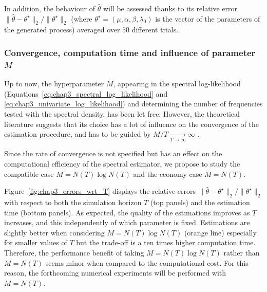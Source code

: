         In addition, the behaviour of $\hat \theta$ will be assessed thanks to its relative error ${\|\hat \theta - \theta^\star\|_2}/{\|\theta^\star\|_2}$
        (where $\theta^\star = (\mu, \alpha, \beta, \lambda_0)$ is the vector of the parameters of the generated process)
        averaged over $50$ different trials.



        
      \subsubsection{Convergence, computation time and influence of parameter $M$}
      
        Up to now, the hyperparameter $M$,
        appearing in the spectral log-likelihood (Equations~\eqref{eq:chap3_spectral_log_likelihood} and \eqref{eq:chap3_univariate_log_likelihood})
        and determining the number of frequencies tested with the spectral density,
        has been let free.
        However, the theoretical literature suggests that its choice has a lot of influence on the convergence of the estimation procedure,
        and has to be guided by ${M}/{T} \xrightarrow[T \to \infty]{} \infty$ \parencite{Pham1996}.
        
        Since the rate of convergence is not specified but has an effect on the computational efficiency of the spectral estimator,
        we propose to study the compatible case $M = N(T) \log N(T)$
        and the economy case $M = N(T)$.
		 
        Figure~\ref{fig:chap3_errors_wrt_T} displays the relative errors $\|\hat \theta - \theta^\star\|_2 / \|\theta^\star\|_2$ with respect to both the simulation horizon $T$ (top panels) and the estimation time (bottom panels). 
		 As expected, the quality of the estimations improves as $T$ increases, and this independently of which parameter is fixed.
		 Estimations are slightly better when considering $M = N(T) \log N(T)$ (orange line) especially for smaller values of $T$ but the trade-off is a ten times higher computation time. 
          Therefore, the performance benefit of taking $M = N(T) \log N(T)$ rather than $M = N(T)$ seems minor when compared to the computational cost. For this reason, the forthcoming numerical experiments will be performed with $M = N(T)$.

